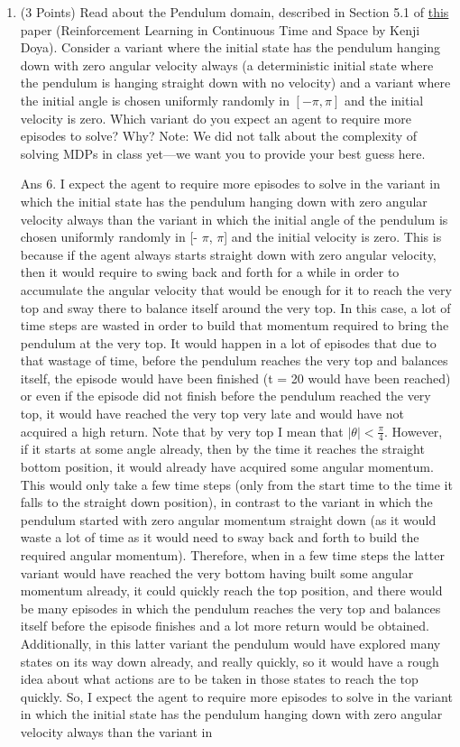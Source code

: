 \documentclass[]{article}
\begin{document}
\begin{enumerate}
    \item (3 Points) Read about the Pendulum domain, described in Section 5.1 of \href{https://homes.cs.washington.edu/~todorov/courses/amath579/reading/Continuous.pdf}{this} paper (Reinforcement Learning in Continuous Time and Space by Kenji Doya). Consider a variant where the initial state has the pendulum hanging down with zero angular velocity always (a deterministic initial state where the pendulum is hanging straight down with no velocity) and a variant where the initial angle is chosen uniformly randomly in $[-\pi,\pi]$ and the initial velocity is zero. Which variant do you expect an agent to require more episodes to solve? Why? Note: We did not talk about the complexity of solving MDPs in class yet---we want you to provide your best guess here.

	{
		\color{blue}
			Ans 6. I expect the agent to require more episodes to solve in the variant in which the initial state has the pendulum hanging down with zero angular velocity always than the variant in which the initial angle of the pendulum is chosen uniformly randomly in [- $\pi$, $\pi$] and the initial velocity is zero. This is because if the agent always starts straight down with zero angular velocity, then it would require to swing back and forth for a while in order to accumulate the angular velocity that would be enough for it to reach the very top and sway there to balance itself around the very top. In this case, a lot of time steps are wasted in order to build that momentum required to bring the pendulum at the very top. It would happen in a lot of episodes that due to that wastage of time, before the pendulum reaches the very top and balances itself, the episode would have been finished (t = 20 would have been reached) or even if the episode did not finish before the pendulum reached the very top, it would have reached the very top very late and would have not acquired a high return. Note that by very top I mean that $|\theta| < \frac{\pi}{4}$. However, if it starts at some angle already, then by the time it reaches the straight bottom position, it would already have acquired some angular momentum. This would only take a few time steps (only from the start time to the time it falls to the straight down position), in contrast to the variant in which the pendulum started with zero angular momentum straight down (as it would waste a lot of time as it would need to sway back and forth to build the required angular momentum). Therefore, when in a few time steps the latter variant would have reached the very bottom having built some angular momentum already, it could quickly reach the top position, and there would be many episodes in which the pendulum reaches the very top and balances itself before the episode finishes and a lot more return would be obtained. Additionally, in this latter variant the pendulum would have explored many states on its way down already, and really quickly, so it would have a rough idea about what actions are to be taken in those states to reach the top quickly. So, I expect the agent to require more episodes to solve in the variant in which the initial state has the pendulum hanging down with zero angular velocity always than the variant in }
\end{enumerate}
\end{document}
